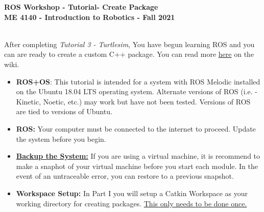 \documentclass[12pt]{article}
\newcommand{\MNUM}{4} %
\newcommand{\MNAME}{Create Package} %
\begin{document}
\thispagestyle{plain}

\begin{center}
   {\bf \Large ROS Workshop - Tutorial\hspc\MNUM\hspc - \MNAME}\vspace{3mm}\\
   {\bf \large ME 4140 - Introduction to Robotics - Fall 2021} \vspace{5mm}\\
\end{center}

\begin{description}[labelindent=1cm]
	
	\item[\textbf{\underline{Overview:}}] \hfill \vspace{3mm}\\
	After completing {\it Tutorial 3 - Turtlesim}, You have begun learning ROS and you can are ready to create a custom C++ package. You can read more \href{http://wiki.ros.org/catkin/Tutorials/create_a_workspace}{here} on the wiki.
	
	\item[\textbf{\underline{System Requirements:}}] \hfill \vspace{0mm}

\begin{itemize}
	\item {\bf ROS+OS}: This tutorial is intended for a system with ROS Melodic installed on the Ubuntu 18.04 LTS operating system. Alternate versions of ROS (i.e. - Kinetic, Noetic, etc.) may work but have not been tested. Versions of ROS are tied to versions of Ubuntu.
	\item {\bf ROS:} Your computer must be connected to the internet to proceed. Update the system before you begin.
\end{itemize}

	
	\item[\textbf{\underline{Disclaimer:}}] \hfill \vspace{0mm}
	
	\begin{itemize}

		\item {\RD\underline{\bf Backup the System:}} If you are using a virtual machine, it is recommend to make a snaphot of your virtual machine before you start each module. In the event of an untraceable error, you can restore to a previous snapshot. 
		
		\item {\bf Workspace Setup:} In Part I you will setup a Catkin Workspace as your working directory for creating packages. {\GR \underline {This only needs to be done once.}}  
	\end{itemize}


\end{description}
\end{document}
